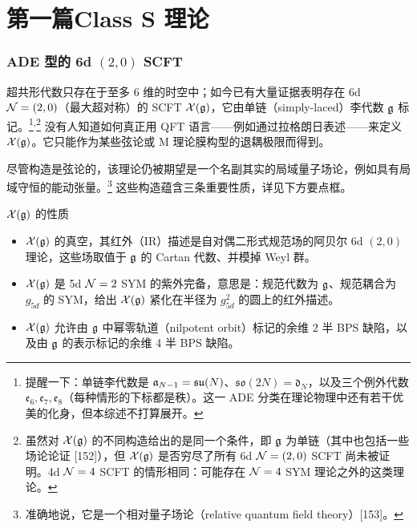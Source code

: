 
\part{第一篇\quad Class S 理论}

\section{ADE 型的 6d $(2,0)$ SCFT}

超共形代数只存在于至多 6 维的时空中；如今已有大量证据表明存在 6d $\mathcal{N}=(2,0)$（最大超对称）的 SCFT $\mathcal{X}(\mathfrak{g})$，它由单链（simply-laced）李代数 $\mathfrak{g}$ 标记。\footnote{提醒一下：单链李代数是 $\mathfrak{a}_{N-1}=\mathfrak{su}(N)$、$\mathfrak{so}(2N)=\mathfrak{d}_N$，以及三个例外代数 $\mathfrak{e}_6,\mathfrak{e}_7,\mathfrak{e}_8$（每种情形的下标都是秩）。这一 ADE 分类在理论物理中还有若干优美的化身，但本综述不打算展开。}\textsuperscript{,}\footnote{虽然对 $\mathcal{X}(\mathfrak{g})$ 的不同构造给出的是同一个条件，即 $\mathfrak{g}$ 为单链（其中也包括一些场论论证 [152]），但 $\mathcal{X}(\mathfrak{g})$ 是否穷尽了所有 6d $\mathcal{N}=(2,0)$ SCFT 尚未被证明。4d $\mathcal{N}=4$ SCFT 的情形相同：可能存在 $\mathcal{N}=4$ SYM 理论之外的这类理论。} 没有人知道如何真正用 QFT 语言------例如通过拉格朗日表述------来定义 $\mathcal{X}(\mathfrak{g})$。它只能作为某些弦论或 M 理论膜构型的退耦极限而得到。


尽管构造是弦论的，该理论仍被期望是一个名副其实的局域量子场论，例如具有局域守恒的能动张量。\footnote{准确地说，它是一个相对量子场论（relative quantum field theory）[153]。} 这些构造蕴含三条重要性质，详见下方要点框。

\begin{keybox}{$\mathcal{X}(\mathfrak{g})$ 的性质}
\begin{itemize}[leftmargin=1.4em,itemsep=1pt,topsep=1pt]
\item $\mathcal{X}(\mathfrak{g})$ 的真空，其红外（IR）描述是自对偶二形式规范场的阿贝尔 6d $(2,0)$ 理论，这些场取值于 $\mathfrak{g}$ 的 Cartan 代数、并模掉 Weyl 群。
\item $\mathcal{X}(\mathfrak{g})$ 是 5d $\mathcal{N}=2$ SYM 的紫外完备，意思是：规范代数为 $\mathfrak{g}$、规范耦合为 $g_{5d}$ 的 SYM，给出 $\mathcal{X}(\mathfrak{g})$ 紧化在半径为 $g_{5d}^2$ 的圆上的红外描述。
\item $\mathcal{X}(\mathfrak{g})$ 允许由 $\mathfrak{g}$ 中幂零轨道（nilpotent orbit）标记的余维 2 半 BPS 缺陷，以及由 $\mathfrak{g}$ 的表示标记的余维 4 半 BPS 缺陷。
\end{itemize}
\end{keybox}

